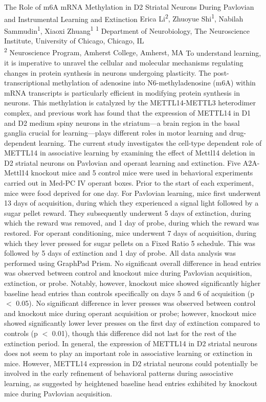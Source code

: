 \makeabstract
    {
    The Role of m6A mRNA Methylation in D2 Striatal Neurons During Pavlovian and Instrumental Learning and Extinction
    }
    {
    Erica Li\textsuperscript{2}, Zhuoyue Shi\textsuperscript{1}, Nabilah Sammudin\textsuperscript{1}, Xiaoxi Zhuang\textsuperscript{1}
    }
    {
    \textsuperscript{1} Department of Neurobiology, The Neuroscience Institute, University of Chicago, Chicago, IL\\
\textsuperscript{2} Neuroscience Program, Amherst College, Amherst, MA
    }
    {
    To understand learning, it is imperative to unravel the cellular and molecular mechanisms regulating changes in protein synthesis in neurons undergoing plasticity. The post-transcriptional methylation of adenosine into N6-methyladenosine (m6A) within mRNA transcripts is particularly efficient in modifying protein synthesis in neurons. This methylation is catalyzed by the METTL14-METTL3 heterodimer complex, and previous work has found that the expression of METTL14 in D1 and D2 medium spiny neurons in the striatum---a brain region in the basal ganglia crucial for learning---plays different roles in motor learning and drug-dependent learning. The current study investigates the cell-type dependent role of METTL14 in associative learning by examining the effect of Mettl14 deletion in D2 striatal neurons on Pavlovian and operant learning and extinction. 
    }
    {
    Five A2A-Mettl14 knockout mice and 5 control mice were used in behavioral experiments carried out in Med-PC IV operant boxes. Prior to the start of each experiment, mice were food deprived for one day. For Pavlovian learning, mice first underwent 13 days of acquisition, during which they experienced a signal light followed by a sugar pellet reward. They subsequently underwent 5 days of extinction, during which the reward was removed, and 1 day of probe, during which the reward was restored. For operant conditioning, mice underwent 7 days of acquisition, during which they lever pressed for sugar pellets on a Fixed Ratio 5 schedule. This was followed by 5 days of extinction and 1 day of probe. All data analysis was performed using GraphPad Prism.
    }
    {
    No significant overall difference in head entries was observed between control and knockout mice during Pavlovian acquisition, extinction, or probe. Notably, however, knockout mice showed significantly higher baseline head entries than controls specifically on days 5 and 6 of acquisition (p \ensuremath{<} 0.05). No significant difference in lever presses was observed between control and knockout mice during operant acquisition or probe; however, knockout mice showed significantly lower lever presses on the first day of extinction compared to controls (p \ensuremath{<} 0.01), though this difference did not last for the rest of the extinction period.
    }
    {
    In general, the expression of METTL14 in D2 striatal neurons does not seem to play an important role in associative learning or extinction in mice. However, METTL14 expression in D2 striatal neurons could potentially be involved in the early refinement of behavioral patterns during associative learning, as suggested by heightened baseline head entries exhibited by knockout mice during Pavlovian acquisition.
    }

    \newpage
    
